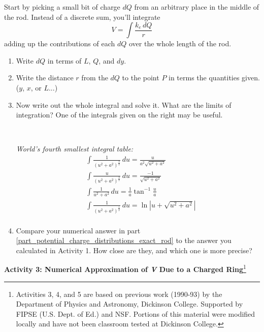 Start by picking a small bit of charge $dQ$ from an arbitrary place in the middle of the rod.  Instead of a discrete sum, you'll integrate
$$V=\int{\frac{k_e\,dQ}{r}}$$
adding up the contributions of each $dQ$ over the whole length of the rod.
\begin{enumerate}[wide, label=(\emph{\alph*})]

\pagebreak[2]
\item Write $dQ$ in terms of $L$, $Q$, and $dy$.
\answerspace{0.3in}

\item Write the distance $r$ from the $dQ$ to the point $P$ in terms the quantities given.  ($y$, $x$, or $L$...) 
\answerspace{0.4in}

\item Now write out the whole integral and solve it.  What are the limits of integration?  One of the integrals given on the right may be useful. \label{part_potential_charge_distributions_exact_rod}

\begin{minipage}{0.65\textwidth}
\
\end{minipage}
\begin{minipage}{0.34\textwidth}

\textit{World's fourth smallest integral table:}
\begin{align*}
&\int \! \frac{1}{\left (u^2 + a^2 \right )^\frac{3}{2}} \, du=\frac{u}{a^2 \sqrt{u^2 + a^2}} \\
&\int \! \frac{u}{\left (u^2 + a^2 \right )^\frac{3}{2}} \, du=\frac{-1}{\sqrt{u^2 + a^2}} \\
&\int \! \frac{1}{u^2 + a^2} \, du=\frac{1}{a} \tan^{-1} \frac{u}{a} \\
&\int \! \frac{1}{\left (u^2 + a^2 \right )^\frac{1}{2}} \, du=\ln \left | u + \sqrt{u^2 + a^2} \right| \\
\end{align*}
\end{minipage}
\item Compare your numerical answer in part \ref{part_potential_charge_distributions_exact_rod} to the answer you calculated in Activity 1.  How close are they, and which one is more precise?
\answerspace{0.4in}

\end{enumerate}

\textbf{Activity 3: Numerical Approximation of \textit{V} Due to a Charged Ring}\footnote{Activities 3, 4, and 5 are based on previous work (1990-93) by the Department of Physics and Astronomy, Dickinson College. Supported by FIPSE (U.S. Dept. of Ed.) and NSF. Portions of this material were modified locally and have not been classroom tested at Dickinson College.}

